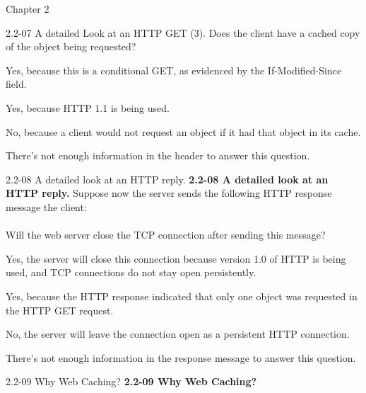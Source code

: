 \documentclass[11pt]{article}
\begin{document}
\begin{quiz}{Chapter 2}
\begin{multi}[points=1,shuffle]{2.2-07 A detailed Look at an HTTP GET (3).}
Does the client have a cached copy of the object being requested? 

\item* Yes, because this is a conditional GET, as evidenced by the If-Modified-Since field.
\item Yes, because HTTP 1.1 is being used.
\item No, because a client would not request an object if it had that object in its cache.
\item There's not enough information in the header to answer this question.
\end{multi}

\begin{multi}[points=1,shuffle]{2.2-08 A detailed look at an HTTP reply.}
\textbf{2.2-08 A detailed look at an HTTP reply.} 
Suppose now the server sends the following HTTP response message the client: \\

\\

Will the web server close the TCP connection after sending this message? 
\item* Yes, the server will close this connection because version 1.0 of HTTP is being used, and TCP connections do not stay open persistently.
\item Yes, because the HTTP response indicated that only one object was requested in the HTTP GET request.
\item No, the server will leave the connection open as a persistent HTTP connection.
\item There's not enough information in the response message to answer this question.
\end{multi}

\begin{multi}[points=1,shuffle,multiple]{2.2-09 Why Web Caching?}
\textbf{2.2-09 Why Web Caching?} 


\end{multi}
\end{quiz}
\end{document}
